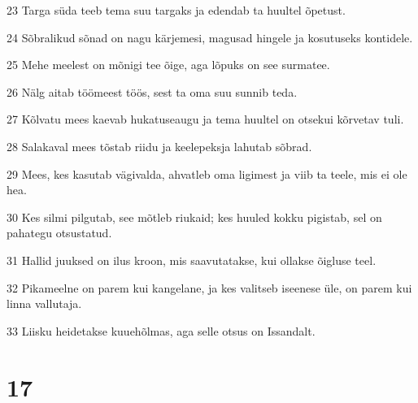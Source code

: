 \par 23 Targa süda teeb tema suu targaks ja edendab ta huultel õpetust.
\par 24 Sõbralikud sõnad on nagu kärjemesi, magusad hingele ja kosutuseks kontidele.
\par 25 Mehe meelest on mõnigi tee õige, aga lõpuks on see surmatee.
\par 26 Nälg aitab töömeest töös, sest ta oma suu sunnib teda.
\par 27 Kõlvatu mees kaevab hukatuseaugu ja tema huultel on otsekui kõrvetav tuli.
\par 28 Salakaval mees tõstab riidu ja keelepeksja lahutab sõbrad.
\par 29 Mees, kes kasutab vägivalda, ahvatleb oma ligimest ja viib ta teele, mis ei ole hea.
\par 30 Kes silmi pilgutab, see mõtleb riukaid; kes huuled kokku pigistab, sel on pahategu otsustatud.
\par 31 Hallid juuksed on ilus kroon, mis saavutatakse, kui ollakse õigluse teel.
\par 32 Pikameelne on parem kui kangelane, ja kes valitseb iseenese üle, on parem kui linna vallutaja.
\par 33 Liisku heidetakse kuuehõlmas, aga selle otsus on Issandalt.

\chapter{17}

